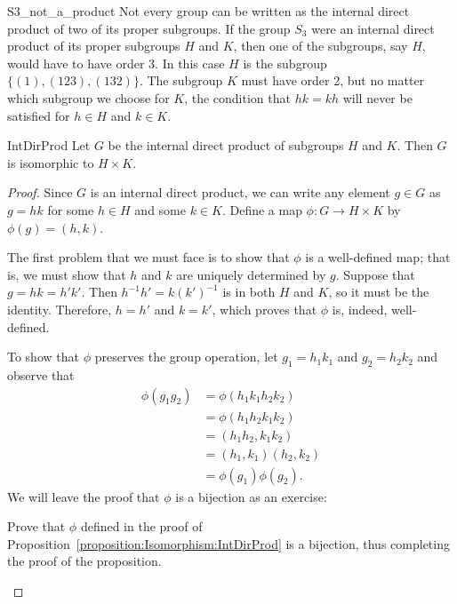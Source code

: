  
\begin{example}{S3_not_a_product}
Not every group can be written as the internal direct product of two
of its proper subgroups.  If the group $S_3$ were an internal direct
product of its proper subgroups $H$ and $K$, then one of the  subgroups,
say $H$, would have to have order 3. In this case $H$ is the subgroup $\{
(1), (123), (132) \}$. The subgroup $K$ must have order 2, but no
matter which subgroup we choose for $K$, the condition that $hk = kh$
will never be satisfied for $h \in H$ and $k \in K$.
\end{example}

 
\begin{prop}{IntDirProd}
Let $G$ be the internal direct product of  subgroups $H$ and $K$. Then
$G$ is isomorphic to $H \times K$. 
\end{prop}
 

\begin{proof}
Since $G$ is an internal direct product, we can write any element $g
\in G$ as $g =hk$ for some $h \in H$ and some $k \in K$. Define a map
$\phi : G \rightarrow H \times K$ by $\phi(g) = (h,k)$.

 
The first problem that we must face is to show that $\phi$ is a
well-defined map; that is, we must show that $h$ and $k$ are uniquely
determined by $g$. Suppose that $g = hk=h'k'$. Then $h^{-1} h'= k
(k')^{-1}$ is in both $H$ and $K$, so it must be the identity.
Therefore, $h = h'$ and $k = k'$, which proves that $\phi$ is, indeed,
well-defined. 

 
To show that $\phi$ preserves the group operation, let $g_1 = h_1 k_1$
and $g_2 = h_2 k_2$ and observe that 
\begin{align*}
\phi( g_1 g_2 ) & = \phi( h_1 k_1 h_2 k_2 )\\
& = \phi(h_1  h_2 k_1 k_2) \\
& = (h_1  h_2, k_1 k_2) \\
& = (h_1, k_1)( h_2, k_2) \\
& = \phi( g_1 ) \phi(  g_2 ).
\end{align*}
We will leave the proof that $\phi$ is a bijection as an exercise:

\begin{exercise}{}
Prove that  $\phi$ defined in the proof of Proposition~\ref{proposition:Isomorphism:IntDirProd} is a bijection, thus completing the proof of the proposition.
 \end{exercise}


\end{proof}

